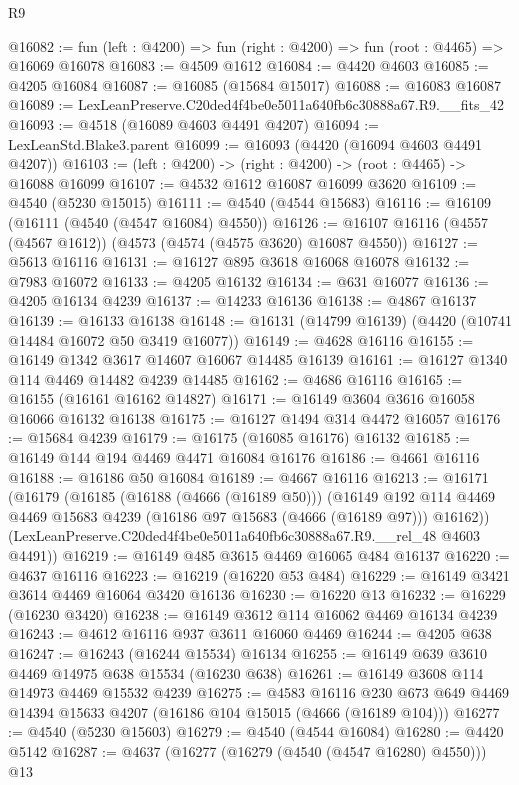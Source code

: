 \begin{lexlean}{R9}
\begin{coremodule}
@16082 := fun (left : @4200) => fun (right : @4200) => fun (root : @4465) => @16069 @16078
@16083 := @4509 @1612
@16084 := @4420 @4603
@16085 := @4205 @16084
@16087 := @16085 (@15684 @15017)
@16088 := @16083 @16087
@16089 := LexLeanPreserve.C20ded4f4be0e5011a640fb6c30888a67.R9.__fits_42
@16093 := @4518 (@16089 @4603 @4491 @4207)
@16094 := LexLeanStd.Blake3.parent
@16099 := @16093 (@4420 (@16094 @4603 @4491 @4207))
@16103 := (left : @4200) -> (right : @4200) -> (root : @4465) -> @16088 @16099
@16107 := @4532 @1612 @16087 @16099 @3620
@16109 := @4540 (@5230 @15015)
@16111 := @4540 (@4544 @15683)
@16116 := @16109 (@16111 (@4540 (@4547 @16084) @4550))
@16126 := @16107 @16116 (@4557 (@4567 @1612)) (@4573 (@4574 (@4575 @3620) @16087 @4550))
@16127 := @5613 @16116
@16131 := @16127 @895 @3618 @16068 @16078
@16132 := @7983 @16072
@16133 := @4205 @16132
@16134 := @631 @16077
@16136 := @4205 @16134 @4239
@16137 := @14233 @16136
@16138 := @4867 @16137
@16139 := @16133 @16138
@16148 := @16131 (@14799 @16139) (@4420 (@10741 @14484 @16072 @50 @3419 @16077))
@16149 := @4628 @16116
@16155 := @16149 @1342 @3617 @14607 @16067 @14485 @16139
@16161 := @16127 @1340 @114 @4469 @14482 @4239 @14485
@16162 := @4686 @16116
@16165 := @16155 (@16161 @16162 @14827)
@16171 := @16149 @3604 @3616 @16058 @16066 @16132 @16138
@16175 := @16127 @1494 @314 @4472 @16057
@16176 := @15684 @4239
@16179 := @16175 (@16085 @16176) @16132
@16185 := @16149 @144 @194 @4469 @4471 @16084 @16176
@16186 := @4661 @16116
@16188 := @16186 @50 @16084
@16189 := @4667 @16116
@16213 := @16171
    (@16179
      (@16185
        (@16188 (@4666 (@16189 @50)))
        (@16149 @192 @114 @4469 @4469 @15683 @4239 (@16186 @97 @15683 (@4666 (@16189 @97))) @16162))
      (LexLeanPreserve.C20ded4f4be0e5011a640fb6c30888a67.R9.__rel_48 @4603 @4491))
@16219 := @16149 @485 @3615 @4469 @16065 @484 @16137
@16220 := @4637 @16116
@16223 := @16219 (@16220 @53 @484)
@16229 := @16149 @3421 @3614 @4469 @16064 @3420 @16136
@16230 := @16220 @13
@16232 := @16229 (@16230 @3420)
@16238 := @16149 @3612 @114 @16062 @4469 @16134 @4239
@16243 := @4612 @16116 @937 @3611 @16060 @4469
@16244 := @4205 @638
@16247 := @16243 (@16244 @15534) @16134
@16255 := @16149 @639 @3610 @4469 @14975 @638 @15534 (@16230 @638)
@16261 := @16149 @3608 @114 @14973 @4469 @15532 @4239
@16275 := @4583
    @16116
    @230
    @673
    @649
    @4469
    @14394
    @15633
    @4207
    (@16186 @104 @15015 (@4666 (@16189 @104)))
@16277 := @4540 (@5230 @15603)
@16279 := @4540 (@4544 @16084)
@16280 := @4420 @5142
@16287 := @4637 (@16277 (@16279 (@4540 (@4547 @16280) @4550))) @13

\end{coremodule}
\end{lexlean}
